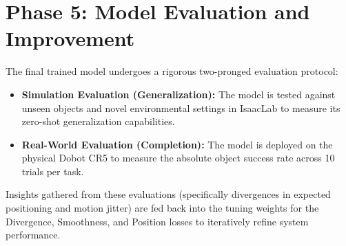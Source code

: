 \section{Phase 5: Model Evaluation and Improvement}
\label{sec:phase5_evaluation}

The final trained model undergoes a rigorous two-pronged evaluation protocol:
\begin{itemize}
    \item \textbf{Simulation Evaluation (Generalization):} The model is tested against unseen objects and novel environmental settings in IsaacLab to measure its zero-shot generalization capabilities.
    \item \textbf{Real-World Evaluation (Completion):} The model is deployed on the physical Dobot CR5 to measure the absolute object success rate across 10 trials per task. 
\end{itemize}
Insights gathered from these evaluations (specifically divergences in expected positioning and motion jitter) are fed back into the tuning weights for the Divergence, Smoothness, and Position losses to iteratively refine system performance.